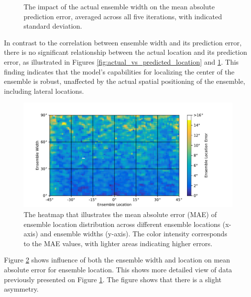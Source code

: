 \documentclass{article}
\begin{document}
\begin{figure}[ht]
\begin{minipage}[t]{0.45\linewidth}
    \caption{\label{fig:mae_location}The impact of the actual ensemble width on the mean absolute prediction error, averaged across all five iterations, with indicated standard deviation.}
  \end{minipage}
\end{figure}

In contrast to the correlation between ensemble width and its prediction error, there is no significant relationship between the actual location and its prediction error, as illustrated in Figures \ref{fig:actual_vs_predicted_location} and \ref{fig:mae_location}. This finding indicates that the model's capabilities for localizing the center of the ensemble is robust, unaffected by the actual spatial positioning of the ensemble, including lateral locations.

\begin{figure}
    \centering
    \includegraphics[width=\linewidth]{../figures/map_mae_location.pdf}
    \caption{\label{fig:map_mae_location}The heatmap that illustrates the mean absolute error (MAE) of ensemble location distribution across different ensemble locations (x-axis) and ensemble widths (y-axis). The color intensity corresponds to the MAE values, with lighter areas indicating higher errors.}
\end{figure}

Figure \ref{fig:map_mae_location} shows influence of both the ensemble width and location on mean absolute error for ensemble location. This shows more detailed view of data previously presented on Figure \ref{fig:mae_location}. The figure shows that there is a slight asymmetry. 
\end{document}
